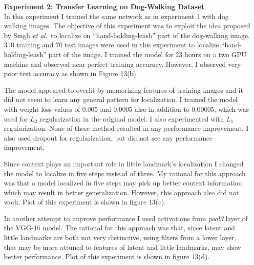 \documentclass [11pt,letterpaper ,openany ]{report}
\begin{document}
    \noindent
    \textbf{Experiment 2: Transfer Learning on Dog-Walking Dataset}\\               
    In this experiment I trained the same network as in experiment 1 with dog walking images. The objective of this experiment was to exploit the idea proposed by Singh \textit{et al}.\ to localize on ``hand-holding-leash'' part of the dog-walking image. 310 training and 70 test images were used in this experiment to localize ``hand-holding-leash'' part of the image. I trained the model for 23 hours on a two GPU machine and observed near perfect training accuracy. However, I observed very poor test accuracy as shown in Figure 13(b).    

    The model appeared to overfit by memorizing features of training images and it did not seem to learn any general pattern for localization. I trained the model with weight loss values of 0.005 and 0.0005 also in addition to 0.00005, which was used for \(L_2\) regularization in the original model. I also experimented with \(L_1\) regularization. None of these method resulted in any performance improvement. I also used dropout \cite{srivastava2014dropout} for regularization, but did not see any performance improvement.

    Since context plays an important role in little landmark's localization I changed the model to localize in five steps instead of three. My rational for this approach was that a model localized in five steps may pick up better context information which may result in better generalization. However, this approach also did not work. Plot of this experiment is shown in figure 13(c).

    In another attempt to improve performance I used activations from \textit{pool3} layer of the VGG-16 model. The rational for this approach was that, since latent and little landmarks are both not very distinctive, using filters from a lower layer, that may be more attuned to features of latent and little landmarks, may show better performance. Plot of this experiment is shown in figure 13(d).\\
\end{document}

